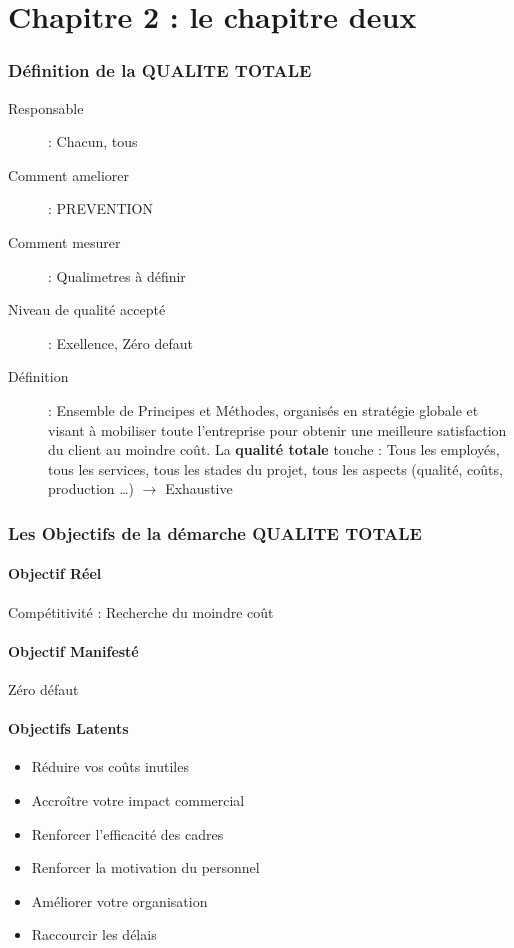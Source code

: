 \part{Chapitre 2 : le chapitre deux}

\section{Définition de la QUALITE TOTALE}

\begin{description}
\item[Responsable] : Chacun, tous
\item[Comment ameliorer] : PREVENTION
\item[Comment mesurer] : Qualimetres à définir
\item[Niveau de qualité accepté] : Exellence, Zéro defaut
\item[Définition] : Ensemble de Principes et Méthodes, organisés en stratégie globale et visant à mobiliser toute l’entreprise pour obtenir une meilleure satisfaction du client au moindre coût. La \textbf{qualité totale} touche : Tous les employés, tous les services, tous les stades du projet, tous les aspects (qualité, coûts, production …) $\rightarrow$ Exhaustive
\end{description}

\section{Les Objectifs de la démarche QUALITE TOTALE}

	\subsection{Objectif Réel}
Compétitivité : Recherche du moindre coût

	\subsection{Objectif Manifesté}
Zéro défaut

	\subsection{Objectifs Latents}
	\begin{itemize}
	\item Réduire vos coûts inutiles
	\item Accroître votre impact commercial
	\item Renforcer l'efficacité des cadres
	\item Renforcer la motivation du personnel
	\item Améliorer votre organisation 
	\item Raccourcir les délais
	\end{itemize}

